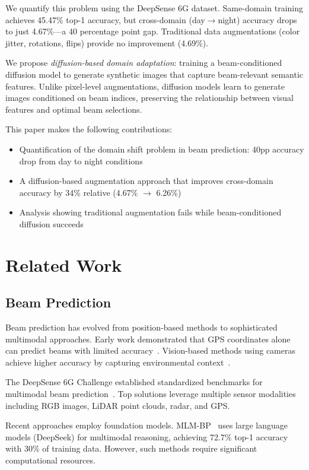 \documentclass[conference]{IEEEtran}
\begin{document}
We quantify this problem using the DeepSense 6G dataset. Same-domain training achieves 45.47\% top-1 accuracy, but cross-domain (day$\to$night) accuracy drops to just 4.67\%---a 40 percentage point gap. Traditional data augmentations (color jitter, rotations, flips) provide no improvement (4.69\%).

We propose \textit{diffusion-based domain adaptation}: training a beam-conditioned diffusion model to generate synthetic images that capture beam-relevant semantic features. Unlike pixel-level augmentations, diffusion models learn to generate images conditioned on beam indices, preserving the relationship between visual features and optimal beam selections.

This paper makes the following contributions:
\begin{itemize}
    \item Quantification of the domain shift problem in beam prediction: 40pp accuracy drop from day to night conditions
    \item A diffusion-based augmentation approach that improves cross-domain accuracy by 34\% relative (4.67\% $\to$ 6.26\%)
    \item Analysis showing traditional augmentation fails while beam-conditioned diffusion succeeds
\end{itemize}

\section{Related Work}

\subsection{Beam Prediction}

Beam prediction has evolved from position-based methods to sophisticated multimodal approaches. Early work demonstrated that GPS coordinates alone can predict beams with limited accuracy~\cite{deepverse2023}. Vision-based methods using cameras achieve higher accuracy by capturing environmental context~\cite{visionbeam2022}.

The DeepSense 6G Challenge established standardized benchmarks for multimodal beam prediction~\cite{deepsense2023}. Top solutions leverage multiple sensor modalities including RGB images, LiDAR point clouds, radar, and GPS.

Recent approaches employ foundation models. MLM-BP~\cite{mlmbp2024} uses large language models (DeepSeek) for multimodal reasoning, achieving 72.7\% top-1 accuracy with 30\% of training data. However, such methods require significant computational resources.
\end{document}
